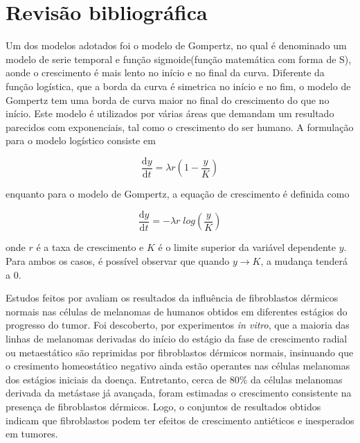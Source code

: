 \documentclass[12pt]{article}
\begin{document}
\section{Revisão bibliográfica} \label{sec:relatedwork} %

Um dos modelos adotados foi o modelo de Gompertz, no qual é denominado um modelo de serie temporal e função sigmoide(função matemática com forma de S), aonde o crescimento é mais lento no início e no final da curva. Diferente da função logística, que a borda da curva é simetrica no início e no fim, o modelo de Gompertz tem uma borda de curva maior no final do crescimento do que no início. Este modelo é utilizados por várias áreas que demandam um resultado parecidos com exponenciais, tal como o crescimento do ser humano. A formulação para o modelo logístico consiste em

\begin{equation} \label{eq:logistic}
  \frac{\mathrm{d} y}{\mathrm{d} t} = \lambda r \left (1 - \frac{y}{K} \right )
\end{equation}

\noindent enquanto para o modelo de Gompertz, a equação de crescimento é definida como

\begin{equation} \label{eq:gompertz}
  \frac{\mathrm{d} y}{\mathrm{d} t} = -\lambda r \; log \left (\frac{y}{K} \right )
\end{equation}

\noindent onde $r$ é a taxa de crescimento e $K$ é o limite superior da variável dependente $y$. Para ambos os casos, é possível observar que quando $y \to K$, a mudança tenderá a 0.


Estudos feitos por \cite{Cornil1991} avaliam os resultados da influência de fibroblastos dérmicos normais nas células de melanomas de humanos obtidos em diferentes estágios do progresso do tumor. Foi descoberto, por experimentos \textit{in vitro}, que a maioria das linhas de melanomas derivadas do início do estágio da fase de crescimento radial ou metaestático são reprimidas por fibroblastos dérmicos normais, insinuando que o cresimento homeostático negativo ainda estão operantes nas células melanomas dos estágios iniciais da doença. Entretanto, cerca de 80\% da células melanomas derivada da metástase já avançada, foram estimadas o crescimento consistente na presença de fibroblastos dérmicos. Logo, o conjuntos de resultados obtidos indicam que fibroblastos podem ter efeitos de crescimento antiéticos e inesperados em tumores.
\end{document}
